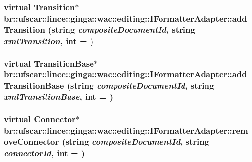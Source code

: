 \label{classbr_1_1ufscar_1_1lince_1_1ginga_1_1wac_1_1editing_1_1IFormatterAdapter_a0d65630a7f103c38c04e06c8a584ecba}
\hypertarget{classbr_1_1ufscar_1_1lince_1_1ginga_1_1wac_1_1editing_1_1IFormatterAdapter_a48ed4a114eced574f59aaf3620c2762e}{
\subsubsection[{addTransition}]{\setlength{\rightskip}{0pt plus 5cm}virtual Transition$\ast$ br::ufscar::lince::ginga::wac::editing::IFormatterAdapter::addTransition (string {\em compositeDocumentId}, \/  string {\em xmlTransition}, \/  int = {})}}
\label{classbr_1_1ufscar_1_1lince_1_1ginga_1_1wac_1_1editing_1_1IFormatterAdapter_a48ed4a114eced574f59aaf3620c2762e}
\hypertarget{classbr_1_1ufscar_1_1lince_1_1ginga_1_1wac_1_1editing_1_1IFormatterAdapter_a5663e47a9808301d1895a88956e8675c}{
\subsubsection[{addTransitionBase}]{\setlength{\rightskip}{0pt plus 5cm}virtual TransitionBase$\ast$ br::ufscar::lince::ginga::wac::editing::IFormatterAdapter::addTransitionBase (string {\em compositeDocumentId}, \/  string {\em xmlTransitionBase}, \/  int = {})}}
\label{classbr_1_1ufscar_1_1lince_1_1ginga_1_1wac_1_1editing_1_1IFormatterAdapter_a5663e47a9808301d1895a88956e8675c}
\hypertarget{classbr_1_1ufscar_1_1lince_1_1ginga_1_1wac_1_1editing_1_1IFormatterAdapter_a825cefaf9055043bef55540808f736e4}{
\subsubsection[{removeConnector}]{\setlength{\rightskip}{0pt plus 5cm}virtual Connector$\ast$ br::ufscar::lince::ginga::wac::editing::IFormatterAdapter::removeConnector (string {\em compositeDocumentId}, \/  string {\em connectorId}, \/  int = {})}}
